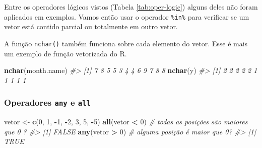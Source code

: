 \documentclass[]{book}
\newenvironment{Shaded}{\begin{snugshade}}{\end{snugshade}}
\newcommand{\KeywordTok}[1]{\textcolor[rgb]{0.13,0.29,0.53}{\textbf{#1}}}
\newcommand{\DecValTok}[1]{\textcolor[rgb]{0.00,0.00,0.81}{#1}}
\newcommand{\StringTok}[1]{\textcolor[rgb]{0.31,0.60,0.02}{#1}}
\newcommand{\CommentTok}[1]{\textcolor[rgb]{0.56,0.35,0.01}{\textit{#1}}}
\newcommand{\OperatorTok}[1]{\textcolor[rgb]{0.81,0.36,0.00}{\textbf{#1}}}
\newcommand{\NormalTok}[1]{#1}
\begin{document}
Entre os operadores lógicos vistos (Tabela \ref{tab:oper-logic}) alguns
deles não foram aplicados em exemplos. Vamos então usar o operador
\texttt{\%in\%} para verificar se um vetor está contido parcial ou
totalmente em outro vetor.

\begin{Shaded}
\end{Shaded}

A função \texttt{nchar()} também funciona sobre cada elemento do vetor.
Esse é mais um exemplo de função vetorizada do R.

\begin{Shaded}
\begin{Highlighting}[]
\KeywordTok{nchar}\NormalTok{(month.name)}
\CommentTok{#>  [1] 7 8 5 5 3 4 4 6 9 7 8 8}
\KeywordTok{nchar}\NormalTok{(y)}
\CommentTok{#>  [1] 2 2 2 2 2 1 1 1 1 1}
\end{Highlighting}
\end{Shaded}

\subsubsection{\texorpdfstring{Operadores \texttt{any} e
\texttt{all}}{Operadores any e all}}\label{operadores-any-e-all}

\begin{Shaded}
\begin{Highlighting}[]
\NormalTok{vetor <-}\StringTok{ }\KeywordTok{c}\NormalTok{(}\DecValTok{0}\NormalTok{, }\DecValTok{1}\NormalTok{, }\OperatorTok{-}\DecValTok{1}\NormalTok{, }\OperatorTok{-}\DecValTok{2}\NormalTok{, }\DecValTok{3}\NormalTok{, }\DecValTok{5}\NormalTok{, }\OperatorTok{-}\DecValTok{5}\NormalTok{)}
\KeywordTok{all}\NormalTok{(vetor }\OperatorTok{<}\StringTok{ }\DecValTok{0}\NormalTok{)  }\CommentTok{# todas as posições são maiores que 0 ?}
\CommentTok{#> [1] FALSE}
\KeywordTok{any}\NormalTok{(vetor }\OperatorTok{>}\StringTok{ }\DecValTok{0}\NormalTok{)  }\CommentTok{# alguma posição é maior que 0?}
\CommentTok{#> [1] TRUE}
\end{Highlighting}
\end{Shaded}
\end{document}
